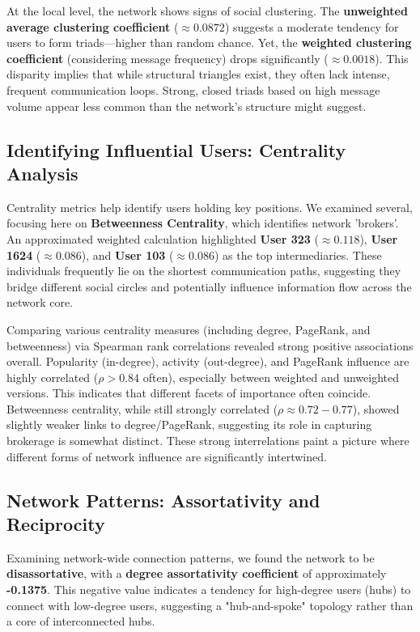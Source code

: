 At the local level, the network shows signs of social clustering. The \textbf{unweighted average clustering coefficient} ($\approx 0.0872$) suggests a moderate tendency for users to form triads—higher than random chance. Yet, the \textbf{weighted clustering coefficient} (considering message frequency) drops significantly ($\approx 0.0018$). This disparity implies that while structural triangles exist, they often lack intense, frequent communication loops. Strong, closed triads based on high message volume appear less common than the network's structure might suggest.

\subsection{Identifying Influential Users: Centrality Analysis}
\label{sec:centrality_analysis}

Centrality metrics help identify users holding key positions. We examined several, focusing here on \textbf{Betweenness Centrality}, which identifies network 'brokers'. An approximated weighted calculation highlighted \textbf{User 323} ($\approx 0.118$), \textbf{User 1624} ($\approx 0.086$), and \textbf{User 103} ($\approx 0.086$) as the top intermediaries. These individuals frequently lie on the shortest communication paths, suggesting they bridge different social circles and potentially influence information flow across the network core.

Comparing various centrality measures (including degree, PageRank, and betweenness) via Spearman rank correlations revealed strong positive associations overall. Popularity (in-degree), activity (out-degree), and PageRank influence are highly correlated ($\rho > 0.84$ often), especially between weighted and unweighted versions. This indicates that different facets of importance often coincide. Betweenness centrality, while still strongly correlated ($\rho \approx 0.72 - 0.77$), showed slightly weaker links to degree/PageRank, suggesting its role in capturing brokerage is somewhat distinct. These strong interrelations paint a picture where different forms of network influence are significantly intertwined.

\subsection{Network Patterns: Assortativity and Reciprocity}
\label{sec:degree_patterns}

Examining network-wide connection patterns, we found the network to be \textbf{disassortative}, with a \textbf{degree assortativity coefficient} of approximately \textbf{-0.1375}. This negative value indicates a tendency for high-degree users (hubs) to connect with low-degree users, suggesting a "hub-and-spoke" topology rather than a core of interconnected hubs.


